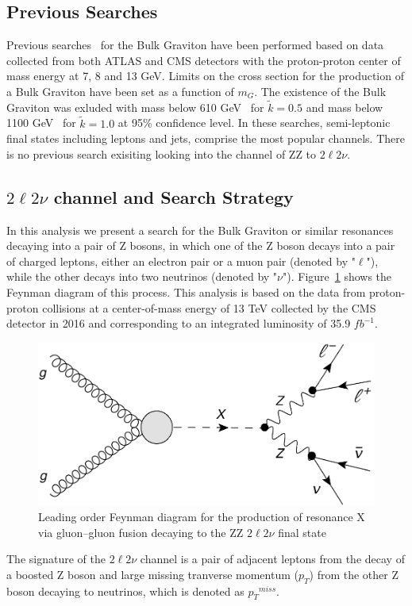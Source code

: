 \subsection{Previous Searches}
Previous searches~\cite{Aad:2012nev,Aad:2013wxa,Aad:2014xka,Chatrchyan:2012baa,Khachatryan:2014gha,Aaboud:2016okv} for the Bulk Graviton have been performed based on data collected from both ATLAS and CMS detectors with the proton-proton center of mass energy at 7, 8 and 13 GeV. Limits on the cross section for the production of a Bulk Graviton have been set as a function of $m_{G}$. The existence of the Bulk Graviton was exluded with mass below 610 GeV~\cite{Chatrchyan:2012baa} for $\tilde{k}=0.5$ and mass below 1100 GeV~\cite{Aaboud:2016okv} for $\tilde{k}=1.0$ at 95\% confidence level. In these searches, semi-leptonic final states including leptons and jets, comprise the most popular channels. There is no previous search exisiting looking into the channel of ZZ to $2\ell 2\nu$.
\subsection{$2\ell 2\nu$ channel and  Search Strategy}
In this analysis we present a search for the Bulk Graviton or similar resonances decaying into a pair of Z bosons, in which one of the Z boson decays into a pair of charged leptons, either an electron pair or a muon pair (denoted by "$\ell$"), while the other decays into two neutrinos (denoted by "$\nu$"). Figure~\ref{fig:intro_llnndiagram} shows the Feynman diagram of this process. This analysis is based on the data from proton-proton collisions at a center-of-mass energy of 13 TeV collected by the CMS detector in 2016 and corresponding to an integrated luminosity of 35.9 $fb^{-1}$. 
\begin{figure}[htbp]
\begin{center}
\includegraphics[width=0.72\linewidth]{figures/intro_llnndiagram.pdf}
\caption{Leading order Feynman diagram for the production of resonance X via gluon–gluon fusion decaying to the ZZ $2\ell 2\nu$ final state}
\label{fig:intro_llnndiagram}
\end{center}
\end{figure}
The signature of the  $2\ell 2\nu$ channel is a pair of adjacent leptons from the decay of a boosted Z boson and large missing tranverse momentum ($p_{T}$) from the other Z boson decaying to neutrinos, which is denoted as ${p_{T}}^{miss}$.

